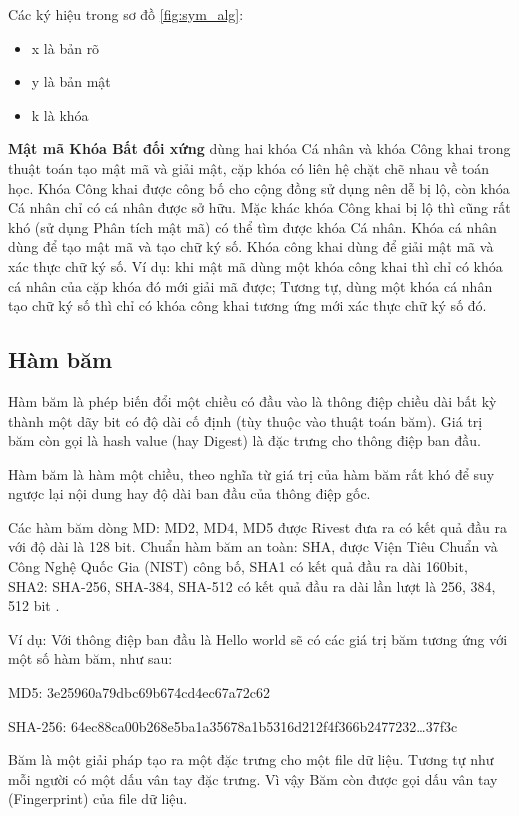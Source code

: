Các ký hiệu trong sơ đồ \ref{fig:sym_alg}:
\begin{itemize}
\item x là bản rõ
\item y là bản mật
\item k là khóa 
\end{itemize}

\textbf{Mật mã Khóa Bất đối xứng} dùng hai khóa Cá nhân và khóa Công khai trong thuật toán tạo mật mã và giải mật, cặp khóa có liên hệ chặt chẽ nhau về toán học. Khóa Công khai được công bố cho cộng đồng sử dụng nên dễ bị lộ, còn khóa Cá nhân chỉ có cá nhân được sở hữu. Mặc khác khóa Công khai bị lộ thì cũng rất khó (sử dụng Phân tích mật mã) có thể tìm được khóa Cá nhân.
Khóa cá nhân dùng để tạo mật mã và tạo chữ ký số. Khóa công khai dùng để giải mật mã và xác thực chữ ký số. Ví dụ: khi mật mã dùng một khóa công khai thì chỉ có khóa cá nhân của cặp khóa đó mới giải mã được; Tương tự, dùng một khóa cá nhân tạo chữ ký số thì chỉ có khóa công khai tương ứng mới xác thực chữ ký số đó.

\subsection{Hàm băm}

Hàm băm là phép biến đổi một chiều có đầu vào là thông điệp chiều dài bất kỳ thành một dãy bit có độ dài cố định (tùy thuộc vào thuật toán băm). Giá trị băm còn gọi là hash value (hay Digest) là đặc trưng cho thông điệp ban đầu.

Hàm băm là hàm một chiều, theo nghĩa từ giá trị của hàm băm rất khó để suy ngược lại nội dung hay độ dài ban đầu của thông điệp gốc.

Các hàm băm dòng MD: MD2, MD4, MD5 được Rivest đưa ra có kết quả đầu ra với độ dài là 128 bit. Chuẩn hàm băm an toàn: SHA, được Viện Tiêu Chuẩn và Công Nghệ Quốc Gia (NIST) công bố, SHA1 có kết quả đầu ra dài 160bit, SHA2: SHA-256, SHA-384, SHA-512 có kết quả đầu ra dài lần lượt là 256, 384, 512 bit \cite{10.5555/1721909}.

Ví dụ: Với thông điệp ban đầu là Hello world sẽ có các giá trị băm tương ứng với một số hàm băm, như sau:

MD5: 3e25960a79dbc69b674cd4ec67a72c62

SHA-256: 64ec88ca00b268e5ba1a35678a1b5316d212f4f366b2477232\ldots 37f3c

Băm là một giải pháp tạo ra một đặc trưng cho một file dữ liệu. Tương tự như mỗi người có một dấu vân tay đặc trưng. Vì vậy Băm còn được gọi dấu vân tay (Fingerprint) của file dữ liệu.

